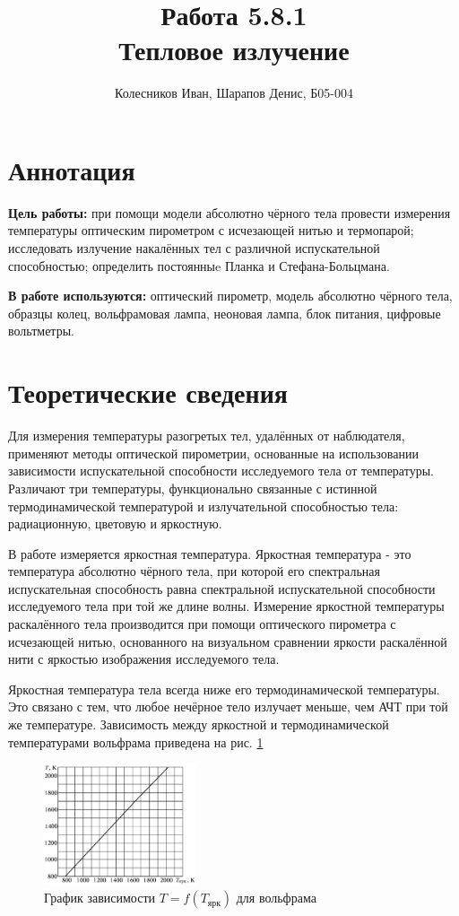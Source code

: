 \documentclass[a4paper]{article}
\title{Работа 5.8.1 \\ Тепловое излучение}
\author{Колесников Иван, Шарапов Денис, Б05-004}
\date{}
\begin{document}
    \maketitle
    \tableofcontents
    \newpage
    
\section{Аннотация}

\noindent\textbf{Цель работы:} при помощи модели абсолютно чёрного тела провести измерения температуры
оптическим пирометром с исчезающей нитью и термопарой; исследовать излучение накалённых тел с различной испускательной способностью; определить постоянныe Планка и Стефана-Больцмана. \smallskip
 
\noindent \textbf{В работе используются:} оптический пирометр, модель абсолютно чёрного тела, образцы колец, вольфрамовая
лампа, неоновая лампа, блок питания, цифровые вольтметры.

\section{Теоретические сведения}

Для измерения температуры разогретых тел, удалённых от наблюдателя, применяют методы оптической пирометрии, основанные на использовании зависимости испускательной способности исследуемого тела от температуры. Различают три температуры, функционально связанные с истинной термодинамической температурой и излучательной способностью тела: радиационную, цветовую и яркостную. \medskip

\noindent В работе измеряется яркостная температура. Яркостная температура - это температура абсолютно чёрного тела, при которой его спектральная испускательная способность равна спектральной испускательной способности исследуемого тела при той же длине волны. Измерение яркостной температуры раскалённого тела производится при помощи оптического пирометра с исчезающей нитью, основанного на визуальном сравнении яркости раскалённой нити с яркостью изображения исследуемого тела. \medskip


\noindent Яркостная температура тела всегда ниже его термодинамической температуры. Это связано с тем, что любое нечёрное тело излучает меньше, чем АЧТ при той же температуре. Зависимость между яркостной и термодинамической температурами
вольфрама приведена на рис. \ref*{fig:graph1}

\begin{figure}[ht!]
    \centering
    \includegraphics[width = 0.4\textwidth]{image/pic1.png}
    \caption{График зависимости $T = f(T_{\text{ярк}})$ для вольфрама}
    \label{fig:graph1}
\end{figure}
\end{document}
